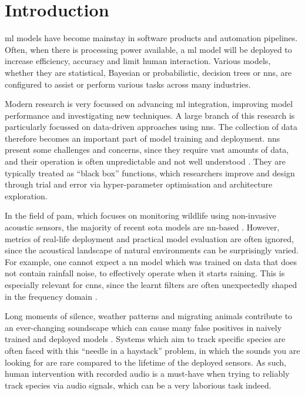 \chapter{Introduction}

\Ac{ml} models have become mainstay in software products and automation pipelines. Often, when there is processing power available, a \ac{ml} model will be deployed to increase efficiency, accuracy and limit human interaction. Various models, whether they are statistical, Bayesian or probabilistic, decision trees or \acfp{nn}, are configured to assist or perform various tasks across many industries.

Modern research is very focussed on advancing \ac{ml} integration, improving model performance and investigating new techniques. A large branch of this research is particularly focussed on data-driven approaches using \acp{nn}. The collection of data therefore becomes an important part of model training and deployment. \Acp{nn} present some challenges and concerns, since they require vast amounts of data, and their operation is often unpredictable and not well understood \citep{nnsurvey}. They are typically treated as ``black box'' functions, which researchers improve and design through trial and error via hyper-parameter optimisation and architecture exploration.

In the field of \ac{pam}, which focuses on monitoring wildlife using non-invasive acoustic sensors, the majority of recent \ac{sota} models are \ac{nn}-based \citep{pamsurvey}. However, metrics of real-life deployment and practical model evaluation are often ignored, since the acoustical landscape of natural environments can be surprisingly varied. For example, one cannot expect a \ac{nn} model which was trained on data that does not contain rainfall noise, to effectively operate when it starts raining. This is especially relevant for \acp{cnn}, since the learnt filters are often unexpectedly shaped in the frequency domain \cite{sincnet}.

Long moments of silence, weather patterns and migrating animals contribute to an ever-changing soundscape which can cause many false positives in naively trained and deployed models \citep{pamguide}. Systems which aim to track specific species are often faced with this ``needle in a haystack'' problem, in which the sounds you are looking for are rare compared to the lifetime of the deployed sensors. As such, human intervention with recorded audio is a must-have when trying to reliably track species via audio signals, which can be a very laborious task indeed.

